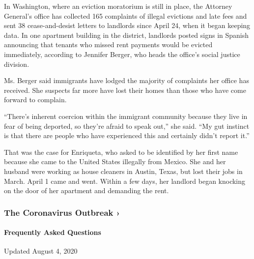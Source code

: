In Washington, where an eviction moratorium is still in place, the
Attorney General's office has collected 165 complaints of illegal
evictions and late fees and sent 38 cease-and-desist letters to
landlords since April 24, when it began keeping data. In one apartment
building in the district, landlords posted signs in Spanish announcing
that tenants who missed rent payments would be evicted immediately,
according to Jennifer Berger, who heads the office's social justice
division.

Ms. Berger said immigrants have lodged the majority of complaints her
office has received. She suspects far more have lost their homes than
those who have come forward to complain.

``There's inherent coercion within the immigrant community because they
live in fear of being deported, so they're afraid to speak out,'' she
said. ``My gut instinct is that there are people who have experienced
this and certainly didn't report it.''

That was the case for Enriqueta, who asked to be identified by her first
name because she came to the United States illegally from Mexico. She
and her husband were working as house cleaners in Austin, Texas, but
lost their jobs in March. April 1 came and went. Within a few days, her
landlord began knocking on the door of her apartment and demanding the
rent.

\href{https://www.nytimes3xbfgragh.onion/news-event/coronavirus?action=click\&pgtype=Article\&state=default\&region=MAIN_CONTENT_3\&context=storylines_faq}{}

\hypertarget{the-coronavirus-outbreak-}{%
\subsubsection{The Coronavirus Outbreak
›}\label{the-coronavirus-outbreak-}}

\hypertarget{frequently-asked-questions}{%
\paragraph{Frequently Asked
Questions}\label{frequently-asked-questions}}

Updated August 4, 2020

